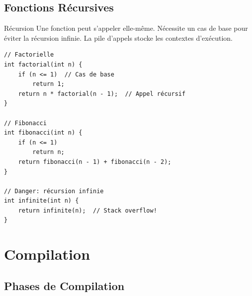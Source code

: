 \documentclass[10pt,a4paper]{article}
\begin{document}
\subsection{Fonctions Récursives}

\begin{definitionbox}{Récursion}
Une fonction peut s'appeler elle-même. Nécessite un cas de base pour éviter la récursion infinie. La pile d'appels stocke les contextes d'exécution.
\end{definitionbox}

\begin{lstlisting}[caption={Fonction récursive}]
// Factorielle
int factorial(int n) {
    if (n <= 1)  // Cas de base
        return 1;
    return n * factorial(n - 1);  // Appel récursif
}

// Fibonacci
int fibonacci(int n) {
    if (n <= 1)
        return n;
    return fibonacci(n - 1) + fibonacci(n - 2);
}

// Danger: récursion infinie
int infinite(int n) {
    return infinite(n);  // Stack overflow!
}
\end{lstlisting}

\section{Compilation}

\subsection{Phases de Compilation}
\end{document}
